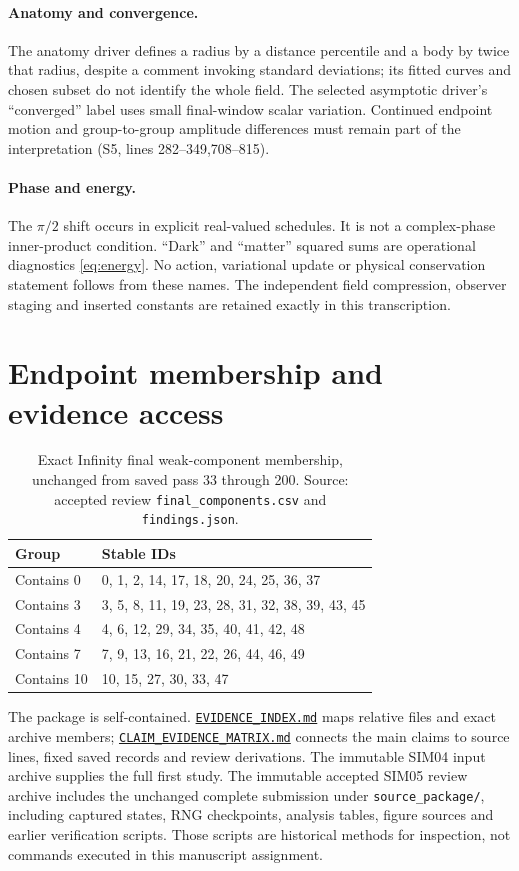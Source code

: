 \documentclass[11pt,a4paper]{article}
\newcommand{\src}[2]{\textsf{#1}, lines #2}
\begin{document}
\paragraph{Anatomy and convergence.} The anatomy driver defines a radius by a distance percentile and a body by twice that radius, despite a comment invoking standard deviations; its fitted curves and chosen subset do not identify the whole field. The selected asymptotic driver's ``converged'' label uses small final-window scalar variation. Continued endpoint motion and group-to-group amplitude differences must remain part of the interpretation (\src{S5}{282--349,708--815}).

\paragraph{Phase and energy.} The $\pi/2$ shift occurs in explicit real-valued schedules. It is not a complex-phase inner-product condition. ``Dark'' and ``matter'' squared sums are operational diagnostics \eqref{eq:energy}. No action, variational update or physical conservation statement follows from these names. The independent field compression, observer staging and inserted constants are retained exactly in this transcription.

\section{Endpoint membership and evidence access}
\label{app:members}
\begin{table}[ht]
\centering\small\caption{Exact Infinity final weak-component membership, unchanged from saved pass 33 through 200. Source: accepted review \texttt{final\_components.csv} and \texttt{findings.json}.}
\begin{tabularx}{\linewidth}{@{}lX@{}}\toprule
Group & Stable IDs\\\midrule
Contains 0 & 0, 1, 2, 14, 17, 18, 20, 24, 25, 36, 37\\
Contains 3 & 3, 5, 8, 11, 19, 23, 28, 31, 32, 38, 39, 43, 45\\
Contains 4 & 4, 6, 12, 29, 34, 35, 40, 41, 42, 48\\
Contains 7 & 7, 9, 13, 16, 21, 22, 26, 44, 46, 49\\
Contains 10 & 10, 15, 27, 30, 33, 47\\
\bottomrule\end{tabularx}
\end{table}

The package is self-contained. \href{EVIDENCE_INDEX.md}{\texttt{EVIDENCE\_INDEX.md}} maps relative files and exact archive members; \href{CLAIM_EVIDENCE_MATRIX.md}{\texttt{CLAIM\_EVIDENCE\_MATRIX.md}} connects the main claims to source lines, fixed saved records and review derivations. The immutable SIM04 input archive supplies the full first study. The immutable accepted SIM05 review archive includes the unchanged complete submission under \texttt{source\_package/}, including captured states, RNG checkpoints, analysis tables, figure sources and earlier verification scripts. Those scripts are historical methods for inspection, not commands executed in this manuscript assignment.
\end{document}
